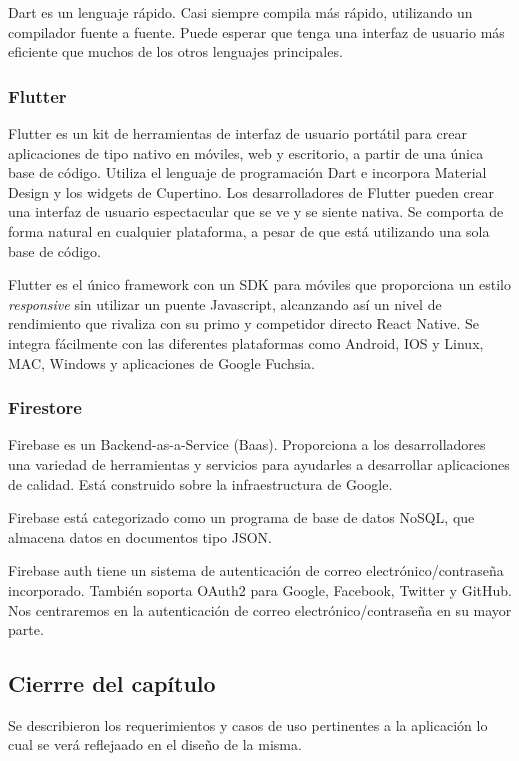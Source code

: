 \documentclass{article}
\begin{document}
Dart es un lenguaje rápido. Casi siempre compila más rápido, utilizando 
un compilador fuente a fuente. Puede esperar que tenga una interfaz de 
usuario más eficiente que muchos de los otros lenguajes principales.


\subsubsection{Flutter}
Flutter es un kit de herramientas de interfaz de usuario portátil para crear 
aplicaciones de tipo nativo en móviles, web y escritorio, a partir de una 
única base de código. Utiliza el lenguaje de programación Dart e incorpora 
Material Design y los widgets de Cupertino. Los desarrolladores de Flutter 
pueden crear una interfaz de usuario espectacular que se ve y se siente 
nativa. Se comporta de forma natural en cualquier plataforma, a pesar de 
que está utilizando una sola base de código.

Flutter es el único framework con un SDK para móviles que proporciona un 
estilo \emph{responsive} sin utilizar un puente Javascript, alcanzando así un 
nivel de rendimiento que rivaliza con su primo y competidor directo 
React Native. Se integra fácilmente con las diferentes plataformas como 
Android, IOS y Linux, MAC, Windows y aplicaciones de Google Fuchsia.


\subsubsection{Firestore}
Firebase es un Backend-as-a-Service (Baas). Proporciona a los desarrolladores 
una variedad de herramientas y servicios para ayudarles a desarrollar aplicaciones 
de calidad. Está construido sobre la infraestructura de Google.

Firebase está categorizado como un programa de base de datos NoSQL, que almacena 
datos en documentos tipo JSON.

Firebase auth tiene un sistema de autenticación de correo electrónico/contraseña 
incorporado. También soporta OAuth2 para Google, Facebook, Twitter y GitHub. 
Nos centraremos en la autenticación de correo electrónico/contraseña en su mayor 
parte. 


\subsection{Cierrre del capítulo}
Se describieron los requerimientos y casos de uso pertinentes a la aplicación lo cual se verá reflejaado en el diseño de la misma.
\pagebreak
\end{document}
